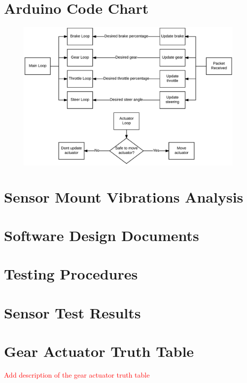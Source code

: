 \documentclass[main.tex]{subfiles}
\begin{document}
\begin{appendices}
\chapter{Arduino Code Chart}
\begin{figure}[ht]
\centering
\includegraphics[]{8-Appendices/arduinoDiagram.png}
\end{figure}

\chapter{Sensor Mount Vibrations Analysis}

\chapter{Software Design Documents}

\chapter{Testing Procedures}

\chapter{Sensor Test Results}

\chapter{Gear Actuator Truth Table}
\textcolor{red}{Add description of the gear actuator truth table}



\end{appendices}
\end{document}
